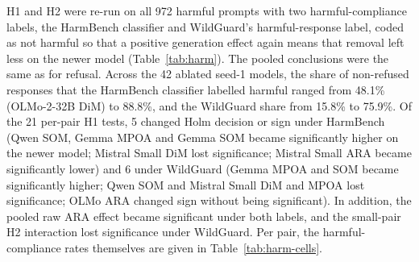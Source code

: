 H1 and H2 were re-run on all 972 harmful prompts with two harmful-compliance
labels, the HarmBench classifier and WildGuard's harmful-response label, coded
as not harmful so that a positive generation effect again means that removal
left less on the newer model (Table~\ref{tab:harm}). The pooled conclusions
were the same as for refusal. Across the 42 ablated seed-1 models, the share
of non-refused responses that the HarmBench classifier labelled harmful ranged
from 48.1\% (OLMo-2-32B DiM) to 88.8\%, and the WildGuard share from 15.8\% to
75.9\%. Of the 21 per-pair H1 tests, 5 changed Holm decision or sign under
HarmBench (Qwen SOM, Gemma MPOA and Gemma SOM became significantly higher on
the newer model; Mistral Small DiM lost significance; Mistral Small ARA became
significantly lower) and 6 under WildGuard (Gemma MPOA and SOM became
significantly higher; Qwen SOM and Mistral Small DiM and MPOA lost
significance; OLMo ARA changed sign without being significant). In addition,
the pooled raw ARA effect became significant under both labels, and the
small-pair H2 interaction lost significance under WildGuard. Per pair, the
harmful-compliance rates themselves are given in Table~\ref{tab:harm-cells}.

